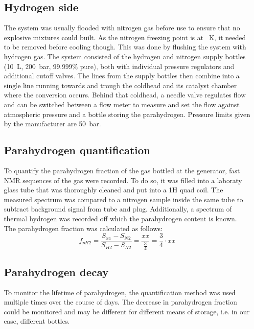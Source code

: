         \subsection{Hydrogen side}
            The system was usually flooded with nitrogen gas before use to ensure that no explosive mixtures could built. As the nitrogen freezing point is at \SI{}{\kelvin}, it needed to be removed before cooling though. This was done by flushing the system with hydrogen gas. The system consisted of the hydrogen and nitrogen supply bottles (\SI{10}{\liter}, \SI{200}{\bar}, 99.999\% pure), both with individual pressure regulators and additional cutoff valves. The lines from the supply bottles then combine into a single line running towards and trough the coldhead and its catalyst chamber where the conversion occurs. Behind that coldhead, a needle valve regulates flow and can be switched between a flow meter to measure and set the flow against atmospheric pressure and a bottle storing the parahydrogen. Pressure limits given by the manufacturer are \SI{50}{\bar}. 
        \subsection{Parahydrogen quantification}
            To quantify the parahydrogen fraction of the gas bottled at the generator, fast NMR sequences of the gas were recorded. To do so, it was filled into a laboraty glass tube that was thoroughly cleaned and put into a 1H quad coil. The measured spectrum was compared to a nitrogen sample inside the same tube to subtract background signal from tube and plug. Additionally, a spectrum of thermal hydrogen was recorded off which the parahydrogen content is known. The parahydrogen fraction was calculated as follows: 
            \begin{equation}
                f_{pH2} = \frac{S_{xx}-S_{N2}}{S_{H2}-S_{N2}} = \frac{xx}{\tfrac{3}{4}} = \frac{3}{4} \cdot xx
            \end{equation}
        \subsection{Parahydrogen decay}
            To monitor the lifetime of parahydrogen, the quantification method was used multiple times over the course of days. The decrease in parahydrogen fraction could be monitored and may be different for different means of storage, i.e. in our case, different bottles.
